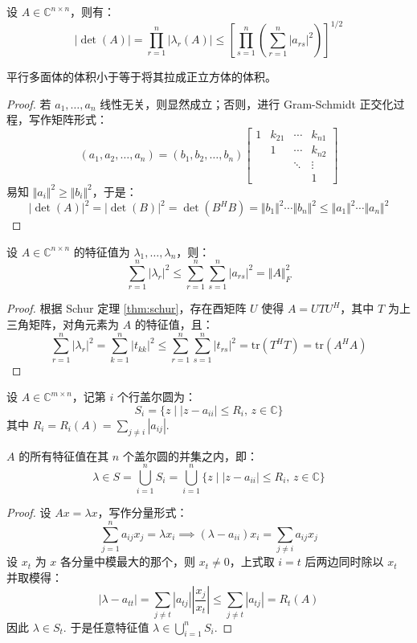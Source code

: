 \begin{theorem}
设 $A\in\mathbb C^{n\times n}$，则有：
\[
    |\det(A)|=\prod_{r=1}^n|\lambda_r(A)|\leq\left[\prod_{s=1}^n\left(\sum_{r=1}^n|a_{rs}|^2\right)\right]^{1/2}
\]
\end{theorem}
\begin{remark}[直观解释]
平行多面体的体积小于等于将其拉成正立方体的体积。
\end{remark}
\begin{proof}
若 $a_1,\ldots,a_n$ 线性无关，则显然成立；否则，进行 Gram-Schmidt 正交化过程，写作矩阵形式：
\[
    (a_1,a_2,\ldots,a_n)=(b_1,b_2,\ldots,b_n)\begin{bmatrix}1&k_{21}&\cdots&k_{n1}\\&1&\cdots&k_{n2}\\&&\ddots&\vdots\\&&&1\end{bmatrix}
\]
易知 $\Vert a_i\Vert^2\geq\Vert b_i\Vert^2$，于是：
\[
    |\det(A)|^2=|\det(B)|^2=\det(B^HB)=\Vert b_1\Vert^2\cdots\Vert b_n\Vert^2\leq\Vert a_1\Vert^2\cdots\Vert a_n\Vert^2
\]
\end{proof}

\begin{theorem}
设 $A\in\mathbb C^{n\times n}$ 的特征值为 $\lambda_1,\ldots,\lambda_n$，则：
\[
    \sum_{r=1}^n|\lambda_r|^2\leq\sum_{r=1}^n\sum_{s=1}^n|a_{rs}|^2=\Vert A\Vert_F^2
\]
\end{theorem}
\begin{proof}
根据 Schur 定理 \ref{thm:schur}，存在酉矩阵 $U$ 使得 $A=UTU^H$，其中 $T$ 为上三角矩阵，对角元素为 $A$ 的特征值，且：
\[
    \sum_{r=1}^n|\lambda_r|^2=\sum_{k=1}^n|t_{kk}|^2\leq\sum_{r=1}^n\sum_{s=1}^n|t_{rs}|^2=\text{tr}(T^HT)=\text{tr}(A^HA)
\]
\end{proof}

\begin{definition}[行盖尔圆]
设 $A\in\mathbb C^{m\times n}$，记第 $i$ 个行盖尔圆为：
\[
    S_i=\{z\mid |z-a_{ii}|\leq R_i,\,z\in\mathbb C\}
\]
其中 $R_i=R_i(A)=\sum_{j\neq i}|a_{ij}|$.
\end{definition}

\begin{theorem}[圆盘定理 1]
$A$ 的所有特征值在其 $n$ 个盖尔圆的并集之内，即：
\[
    \lambda\in S=\bigcup_{i=1}^nS_i=\bigcup_{i=1}^n\{z\mid |z-a_{ii}|\leq R_i,\,z\in\mathbb C\}
\]
\end{theorem}
\begin{proof}
设 $Ax=\lambda x$，写作分量形式：
\[
    \sum_{j=1}^na_{ij}x_j=\lambda x_i\implies (\lambda-a_{ii})x_i=\sum_{j\neq i}a_{ij}x_j
\]
设 $x_t$ 为 $x$ 各分量中模最大的那个，则 $x_t\neq 0$，上式取 $i=t$ 后两边同时除以 $x_t$ 并取模得：
\[
    |\lambda-a_{tt}|=\sum_{j\neq t}|a_{tj}|\left|\frac{x_j}{x_t}\right|\leq\sum_{j\neq t}|a_{tj}|=R_t(A)
\]
因此 $\lambda\in S_t$.  于是任意特征值 $\lambda\in\bigcup_{i=1}^n S_i$.
\end{proof}

